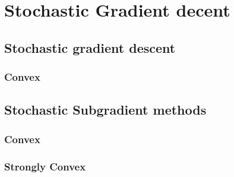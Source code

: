 




\section{Stochastic Gradient decent}



\subsection{Stochastic gradient descent}
\subsubsection{Convex}
\label{sec:convexsmoothsgd}



\subsection{Stochastic Subgradient methods}

\subsubsection{Convex}
\label{sec:sgdcvxnonsmth}



\subsubsection{Strongly Convex}
\label{sec:sgdscvxnonsmth}




